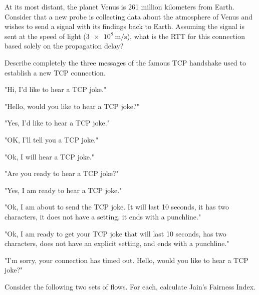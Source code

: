 \documentclass[12pt,addpoints,answers]{exam}
\begin{document}
\begin{questions}
\newpage
\question[5] At its most distant, the planet Venus is 261 million kilometers from Earth. Consider that a new probe is collecting data about the atmosphere of Venus and wishes to send a signal with its findings back to Earth. Assuming the signal is sent at the speed of light ($\SI{3e8}{\meter/\second}$), what is the RTT for this connection based solely on the propagation delay?
\begin{solution}[10em]
\end{solution}
\vfill

\question[8] Describe completely the three messages of the famous TCP handshake used to establish a new TCP connection.
\begin{solution}[10em]
	 "Hi, I'd like to hear a TCP joke."
	
	"Hello, would you like to hear a TCP joke?"
	
	"Yes, I'd like to hear a TCP joke."
	
	"OK, I'll tell you a TCP joke."
	
	"Ok, I will hear a TCP joke."
	
	"Are you ready to hear a TCP joke?"
	
	"Yes, I am ready to hear a TCP joke."
	
	"Ok, I am about to send the TCP joke. It will last 10 seconds, it has two characters, it does not have a setting, it ends with a punchline."
	
	"Ok, I am ready to get your TCP joke that will last 10 seconds, has two characters, does not have an explicit setting, and ends with a punchline."
	
	"I'm sorry, your connection has timed out. Hello, would you like to hear a TCP joke?"
\end{solution}
\vfill

\newpage
\question Consider the following two sets of flows. For each, calculate Jain's Fairness Index.
\end{questions}
\end{document}
